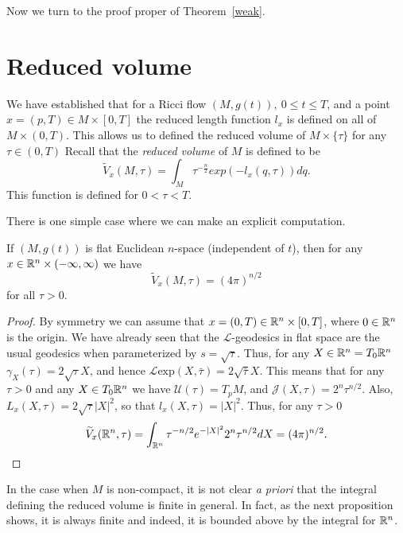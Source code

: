 Now we turn to the proof proper of Theorem~\ref{weak}.

\section{Reduced volume}



We have established that for a Ricci flow $(M,g(t)),\ 0\le t\le T$,
and a point  $x=(p,T)\in M\times [0,T]$ the reduced length function
$l_x$ is defined on all of $M\times (0,T)$. This allows us to
defined the reduced volume of $M\times \{\tau\}$ for any $\tau\in
(0,T)$ Recall that the {\sl reduced volume} of
$M$ is defined to be
$$\widetilde V_x(M,\tau) = \int_{M} \tau^{-\frac{n}{2}}exp(-l_x(q,\tau))dq.$$
This function is defined for $0<\tau<T$.

There is one simple case where we can make an explicit computation.
\begin{lemma}
\label{lem:reduced-volume-flat-space}
\label{flat}
If $(M,g(t))$ is flat Euclidean $n$-space (independent of $t$), then
for any $x\in \mathbb{R}^n\times (-\infty,\infty)$ we have
$$\widetilde V_x(M,\tau)=(4\pi)^{n/2}$$ for all $\tau>0$.
\end{lemma}

\begin{proof}\sketch
By symmetry we can assume that $x=(0,T)\in \mathbb{R}^n\times [0,T]$, where
$0\in \mathbb{R}^n$ is the origin. We have already seen that the ${\mathcal
L}$-geodesics in flat space are the usual geodesics when
parameterized by $s=\sqrt{\tau}$. Thus, for any $X\in
\mathbb{R}^n=T_0\mathbb{R}^n$ $\gamma_X(\tau)=2\sqrt{\tau}X$, and hence ${\mathcal
L}\mathrm{exp}(X,\bar\tau)=2\sqrt{\bar\tau}X$. This means that for any
$\tau>0$ and any $X\in T_0\mathbb{R}^n$ we have ${\mathcal U}(\tau)=T_pM$,
and ${\mathcal J}(X,\tau)=2^n\tau^{n/2}$. Also,
 $L_x(X,\tau)=2\sqrt{\tau}|X|^2$, so that $l_x(X,\tau)=|X|^2$.
 Thus, for any $\tau>0$
 $$\widetilde
 V_x(\mathbb{R}^n,\tau)=\int_{\mathbb{R}^n}\tau^{-n/2}e^{-|X|^2}2^n\tau^{n/2}dX=(4\pi)^{n/2}.$$
\end{proof}


In the case when $M$ is non-compact, it is not clear {\em a priori}
that the integral defining the reduced volume is finite in general.
In fact, as the next proposition shows, it is always finite and
indeed, it is bounded above by the integral for  $\mathbb{R}^n$.

